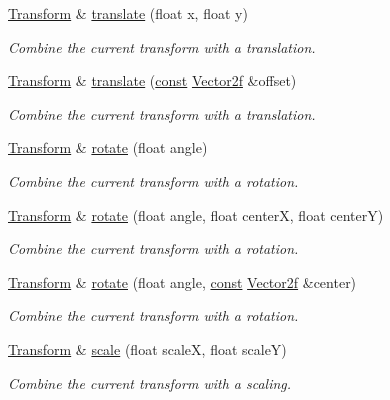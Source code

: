 \begin{DoxyCompactItemize}
\hyperlink{classsf_1_1_transform}{Transform} \& \hyperlink{classsf_1_1_transform_ab54f6c8070cc05e2afcb3145fbf4395a}{translate} (float x, float y)
\begin{DoxyCompactList}\small\item\em Combine the current transform with a translation. \end{DoxyCompactList}\item 
\hyperlink{classsf_1_1_transform}{Transform} \& \hyperlink{classsf_1_1_transform_a452ff6e32d5120fa8c132c1bf0ad83cd}{translate} (\hyperlink{term__entry_8h_a57bd63ce7f9a353488880e3de6692d5a}{const} \hyperlink{namespacesf_a80cea3c46537294fd1d8d428566ad8b2}{Vector2f} \&offset)
\begin{DoxyCompactList}\small\item\em Combine the current transform with a translation. \end{DoxyCompactList}\item 
\hyperlink{classsf_1_1_transform}{Transform} \& \hyperlink{classsf_1_1_transform_a3e548c3c9e3fb9d4bd43cf852669e555}{rotate} (float angle)
\begin{DoxyCompactList}\small\item\em Combine the current transform with a rotation. \end{DoxyCompactList}\item 
\hyperlink{classsf_1_1_transform}{Transform} \& \hyperlink{classsf_1_1_transform_af0b7cc3fed36d0fa22d5d331a779eee2}{rotate} (float angle, float center\-X, float center\-Y)
\begin{DoxyCompactList}\small\item\em Combine the current transform with a rotation. \end{DoxyCompactList}\item 
\hyperlink{classsf_1_1_transform}{Transform} \& \hyperlink{classsf_1_1_transform_ad2a2520ad81724079d109d4a986f9902}{rotate} (float angle, \hyperlink{term__entry_8h_a57bd63ce7f9a353488880e3de6692d5a}{const} \hyperlink{namespacesf_a80cea3c46537294fd1d8d428566ad8b2}{Vector2f} \&center)
\begin{DoxyCompactList}\small\item\em Combine the current transform with a rotation. \end{DoxyCompactList}\item 
\hyperlink{classsf_1_1_transform}{Transform} \& \hyperlink{classsf_1_1_transform_a3f46af807f69d74120fb836334268671}{scale} (float scale\-X, float scale\-Y)
\begin{DoxyCompactList}\small\item\em Combine the current transform with a scaling. \end{DoxyCompactList}\item 

\end{DoxyCompactItemize}
